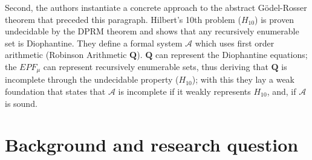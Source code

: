 \documentclass[a4paper]{scrartcl}
\begin{document}
Second, the authors instantiate a concrete approach to the abstract Gödel-Rosser theorem that preceded this paragraph. Hilbert's 10th problem ($H_{10}$) is proven undecidable by the DPRM theorem and shows that any recursively enumerable set is Diophantine. They define a formal system $\mathcal{A}$ which uses first order arithmetic (Robinson Arithmetic $\mathbf{Q}$). $\mathbf{Q}$ can represent the Diophantine equations; the $EPF_\mu$ can represent recursively enumerable sets, thus deriving that $\mathbf{Q}$ is incomplete through the undecidable property ($H_{10}$); with this they lay a weak foundation that states that $\mathcal{A}$ is incomplete if it weakly represents $H_{10}$, and, if $\mathcal{A}$ is sound. 



\FloatBarrier
\section{Background and research question}
\label{sec:background-question}


\end{document}
